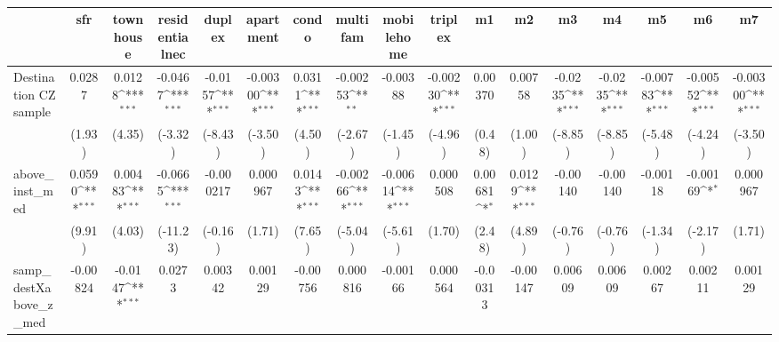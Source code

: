 \begin{table}[htbp]\centering
\def\sym#1{\ifmmode^{#1}\else\(^{#1}\)\fi}
\caption{ \label{tab1}}
\begin{tabular}{l*{16}{c}}
\toprule
                    &\multicolumn{1}{c}{sfr}&\multicolumn{1}{c}{townhouse}&\multicolumn{1}{c}{residentialnec}&\multicolumn{1}{c}{duplex}&\multicolumn{1}{c}{apartment}&\multicolumn{1}{c}{condo}&\multicolumn{1}{c}{multifam}&\multicolumn{1}{c}{mobilehome}&\multicolumn{1}{c}{triplex}&\multicolumn{1}{c}{m1}&\multicolumn{1}{c}{m2}&\multicolumn{1}{c}{m3}&\multicolumn{1}{c}{m4}&\multicolumn{1}{c}{m5}&\multicolumn{1}{c}{m6}&\multicolumn{1}{c}{m7}\\
\midrule
Destination CZ sample&      0.0287         &      0.0128\sym{***}&     -0.0467\sym{***}&     -0.0157\sym{***}&    -0.00300\sym{***}&      0.0311\sym{***}&    -0.00253\sym{**} &    -0.00388         &    -0.00230\sym{***}&     0.00370         &     0.00758         &     -0.0235\sym{***}&     -0.0235\sym{***}&    -0.00783\sym{***}&    -0.00552\sym{***}&    -0.00300\sym{***}\\
                    &      (1.93)         &      (4.35)         &     (-3.32)         &     (-8.43)         &     (-3.50)         &      (4.50)         &     (-2.67)         &     (-1.45)         &     (-4.96)         &      (0.48)         &      (1.00)         &     (-8.85)         &     (-8.85)         &     (-5.48)         &     (-4.24)         &     (-3.50)         \\
\addlinespace
above\_inst\_med      &      0.0590\sym{***}&     0.00483\sym{***}&     -0.0665\sym{***}&   -0.000217         &    0.000967         &      0.0143\sym{***}&    -0.00266\sym{***}&    -0.00614\sym{***}&    0.000508         &     0.00681\sym{*}  &      0.0129\sym{***}&    -0.00140         &    -0.00140         &    -0.00118         &    -0.00169\sym{*}  &    0.000967         \\
                    &      (9.91)         &      (4.03)         &    (-11.23)         &     (-0.16)         &      (1.71)         &      (7.65)         &     (-5.04)         &     (-5.61)         &      (1.70)         &      (2.48)         &      (4.89)         &     (-0.76)         &     (-0.76)         &     (-1.34)         &     (-2.17)         &      (1.71)         \\
\addlinespace
samp\_destXabove\_z\_med&    -0.00824         &     -0.0147\sym{***}&      0.0273         &     0.00342         &     0.00129         &    -0.00756         &    0.000816         &    -0.00166         &    0.000564         &    -0.00313         &    -0.00147         &     0.00609         &     0.00609         &     0.00267         &     0.00211         &     0.00129         \\

\end{tabular}
\end{table}
